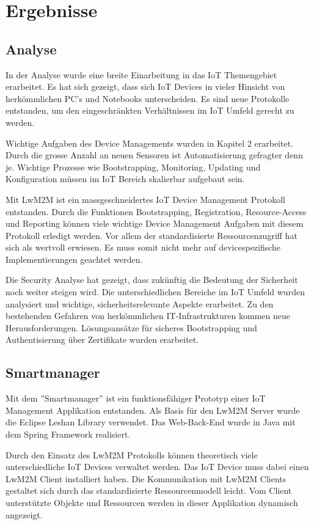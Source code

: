 \chapter{Ergebnisse}
\section{Analyse}
In der Analyse wurde eine breite Einarbeitung in das IoT Themengebiet erarbeitet. Es hat sich gezeigt, dass sich IoT Devices in vieler Hinsicht von herkömmlichen PC's und Notebooks unterscheiden. Es sind neue Protokolle entstanden, um den eingeschränkten Verhältnissen im IoT Umfeld gerecht zu werden.

Wichtige Aufgaben des Device Managements wurden in Kapitel 2 erarbeitet. Durch die grosse Anzahl an neuen Sensoren ist Automatisierung gefragter denn je. Wichtige Prozesse wie Bootstrapping, Monitoring, Updating und Konfiguration müssen im IoT Bereich skalierbar aufgebaut sein.

Mit LwM2M ist ein massgeschneidertes IoT Device Management Protokoll entstanden. Durch die Funktionen Bootstrapping, Registration, Resource-Access und Reporting können viele wichtige Device Management Aufgaben mit diesem Protokoll erledigt werden. Vor allem der standardisierte Ressourcenzugriff hat sich als wertvoll erwiesen. Es muss somit nicht mehr auf devicespezifische Implementierungen geachtet werden.

Die Security Analyse hat gezeigt, dass zukünftig die Bedeutung der Sicherheit noch weiter steigen wird. Die unterschiedlichen Bereiche im IoT Umfeld wurden analysiert und wichtige, sicherheitsrelevante Aspekte erarbeitet. Zu den bestehenden Gefahren von herkömmlichen IT-Infrastrukturen kommen neue Herausforderungen. Lösungsansätze für sicheres Bootstrapping und Authentisierung über Zertifikate wurden erarbeitet.    

\section{Smartmanager}
Mit dem ''Smartmanager'' ist ein funktionsfähiger Prototyp einer IoT Management Applikation entstanden. Als Basis für den LwM2M Server wurde die Eclipse Leshan Library verwendet. Das Web-Back-End wurde in Java mit dem Spring Framework realisiert. 

Durch den Einsatz des LwM2M Protokolls können theoretisch viele unterschiedliche IoT Devices verwaltet werden. Das IoT Device muss dabei einen LwM2M Client installiert haben. Die Kommunikation mit LwM2M Clients gestaltet sich durch das standardisierte Ressourcenmodell leicht. Vom Client unterstützte Objekte und Ressourcen werden in dieser Applikation dynamisch angezeigt.

